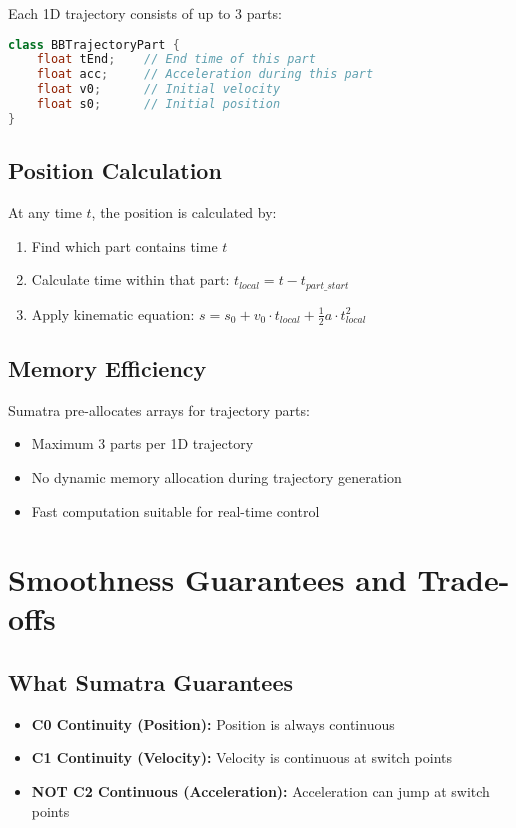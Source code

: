 \documentclass[12pt,a4paper]{article}
\begin{document}
Each 1D trajectory consists of up to 3 parts:

\begin{lstlisting}[language=Java, caption=Trajectory Part Structure]
class BBTrajectoryPart {
    float tEnd;    // End time of this part
    float acc;     // Acceleration during this part
    float v0;      // Initial velocity
    float s0;      // Initial position
}
\end{lstlisting}

\subsection{Position Calculation}

At any time $t$, the position is calculated by:
\begin{enumerate}
    \item Find which part contains time $t$
    \item Calculate time within that part: $t_{local} = t - t_{part\_start}$
    \item Apply kinematic equation: $s = s_0 + v_0 \cdot t_{local} + \frac{1}{2} a \cdot t_{local}^2$
\end{enumerate}

\subsection{Memory Efficiency}

Sumatra pre-allocates arrays for trajectory parts:
\begin{itemize}
    \item Maximum 3 parts per 1D trajectory
    \item No dynamic memory allocation during trajectory generation
    \item Fast computation suitable for real-time control
\end{itemize}

\section{Smoothness Guarantees and Trade-offs}

\subsection{What Sumatra Guarantees}

\begin{itemize}
    \item \textbf{C0 Continuity (Position):} Position is always continuous
    \item \textbf{C1 Continuity (Velocity):} Velocity is continuous at switch points
    \item \textbf{NOT C2 Continuous (Acceleration):} Acceleration can jump at switch points
\end{itemize}
\end{document}
